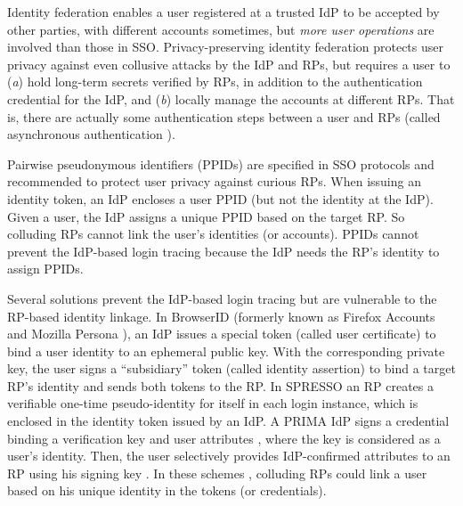 Identity federation enables a user registered at a trusted IdP to be accepted by other parties,
            with different accounts sometimes,
        but \emph{more user operations} are involved than those in SSO.
Privacy-preserving identity federation
    protects user privacy against even collusive attacks by the IdP and RPs,
    but requires a user \cite{ELPASSO,UnlimitID,hyperledge-idemix,PseudoID,Opaak,uprov} to (\emph{a}) hold long-term secrets verified by RPs,
            in addition to the authentication credential for the IdP,
                and (\emph{b}) locally manage the accounts at different RPs.
That is, there are actually some authentication steps between a user and RPs (called asynchronous authentication \cite{ELPASSO}).

Pairwise pseudonymous identifiers (PPIDs) are specified in SSO protocols \cite{OpenIDConnect, SAMLIdentifier} and recommended \cite{NIST2017draft}
to protect user privacy against curious RPs.
When issuing an identity token,
        an IdP encloses a user PPID (but not the identity at the IdP).
Given a user, the IdP assigns a unique PPID based on the target RP.
So colluding RPs cannot link the user's identities (or accounts).
PPIDs cannot prevent the IdP-based login tracing because the IdP needs the RP's identity to assign PPIDs.



Several solutions prevent the IdP-based login tracing but are vulnerable to the RP-based identity linkage.
In BrowserID \cite{BrowserID} (formerly known as Firefox Accounts \cite{FirefoxAccount} and Mozilla Persona \cite{persona}), an IdP %
issues a special token (called user certificate) to bind a user identity to an ephemeral public key.
With the corresponding private key, the user signs a ``subsidiary'' token (called identity assertion) to bind a target RP's identity and sends both tokens to the RP.
In SPRESSO \cite{SPRESSO} an RP creates a verifiable one-time pseudo-identity for itself in each login instance,
 which is enclosed in the identity token issued by an IdP. %
A PRIMA IdP signs a credential
 binding a verification key and user attributes \cite{prima},
  where the key is considered as a user's identity.
Then, the user selectively provides IdP-confirmed attributes to an RP using his signing key \cite{Oblivion}.
In these schemes \cite{BrowserID,SPRESSO,prima}, colluding RPs could link a user based on his unique identity in the tokens (or credentials).


